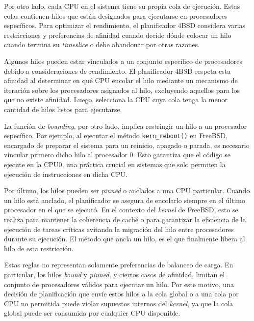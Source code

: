 Por otro lado, cada CPU en el sistema tiene su propia cola de ejecución. Estas colas contienen hilos que están designados para ejecutarse en procesadores específicos. Para optimizar el rendimiento, el planificador 4BSD considera varias restricciones y preferencias de afinidad cuando decide dónde colocar un hilo cuando termina su \textit{timeslice} o debe abandonar por otras razones.

Algunos hilos pueden estar vinculados a un conjunto específico de procesadores debido a consideraciones de rendimiento. El planificador 4BSD respeta esta afinidad al determinar en qué CPU encolar el hilo mediante un mecanismo de iteración sobre los procesadores asignados al hilo, excluyendo aquellos para los que no existe afinidad. Luego, selecciona la CPU cuya cola tenga la menor cantidad de hilos listos para ejecutarse.\par

La función de \textit{bounding}, por otro lado, implica restringir un hilo a un procesador específico. Por ejemplo, al ejecutar el método \verb|kern_reboot()| en FreeBSD, encargado de preparar el sistema para un reinicio, apagado o parada, es necesario vincular primero dicho hilo al procesador 0. Esto garantiza que el código se ejecute en la CPU0, una práctica crucial en sistemas que solo permiten la ejecución de instrucciones en dicha CPU.\par

Por último, los hilos pueden ser \textit{pinned} o anclados a una CPU particular. Cuando un hilo está anclado, el planificador se asegura de encolarlo siempre en el último procesador en el que se ejecutó. En el contexto del \textit{kernel} de FreeBSD, esto se realiza para mantener la coherencia de caché o para garantizar la eficiencia de la ejecución de tareas críticas evitando la migración del hilo entre procesadores durante su ejecución. El método que ancla un hilo, es el que finalmente libera al hilo de esta restricción.\par

Estas reglas no representan solamente preferencias de balanceo de carga. En particular, los hilos \textit{bound} y \textit{pinned}, y ciertos casos de afinidad, limitan el conjunto de procesadores válidos para ejecutar un hilo. Por este motivo, una decisión de planificación que envíe estos hilos a la cola global o a una cola por CPU no permitida puede violar supuestos internos del \textit{kernel}, ya que la cola global puede ser consumida por cualquier CPU disponible.\par


